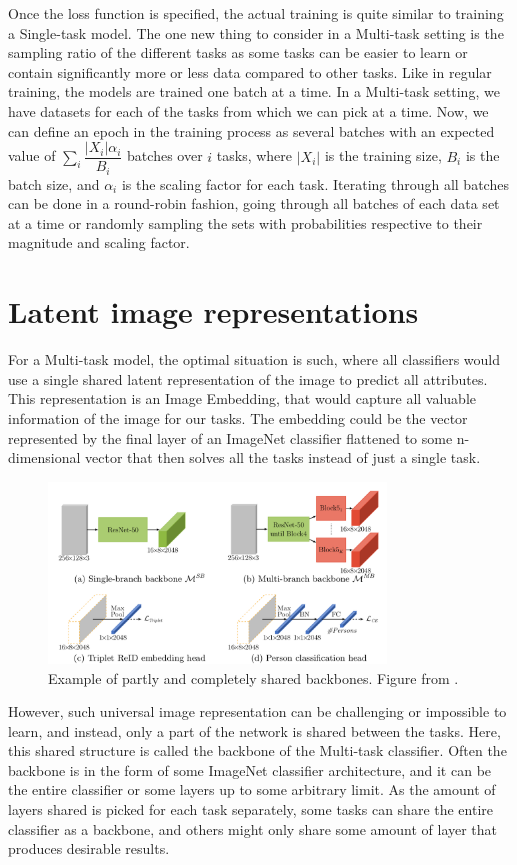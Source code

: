 Once the loss function is specified, the actual training is quite similar to training a Single-task model.
The one new thing to consider in a Multi-task setting is the sampling ratio of the different tasks as some tasks can be easier to learn or contain significantly more or less data compared to other tasks.
Like in regular training, the models are trained one batch at a time.
In a Multi-task setting, we have datasets for each of the tasks from which we can pick at a time.
Now, we can define an epoch in the training process as several batches with an expected value of $\sum_i{ \dfrac{|X_i| \alpha_i}{B_i}}$ batches over $i$ tasks, where $|X_i|$ is the training size, $B_i$ is the batch size, and $\alpha_i$ is the scaling factor for each task.
Iterating through all batches can be done in a round-robin fashion,  going through all batches of each data set at a time or randomly sampling the sets with probabilities respective to their magnitude and scaling factor.

\section{Latent image representations}
For a Multi-task model, the optimal situation is such, where all classifiers would use a single shared latent representation of the image to predict all attributes.
This representation is an Image Embedding, that would capture all valuable information of the image for our tasks.
The embedding could be the vector represented by the final layer of an ImageNet classifier flattened to some n-dimensional vector that then solves all the tasks instead of just a single task.
\begin{figure}[h!]
    \centering
    \includegraphics[width=0.8\textwidth]{imgs/sharedBackbone.png}
    \caption{Example of partly and completely shared backbones. Figure from \citep{visualPerson}.\label{fig:params}}
\end{figure}
However, such universal image representation can be challenging or impossible to learn, and instead, only a part of the network is shared between the tasks.
Here, this shared structure is called the backbone of the Multi-task classifier.
Often the backbone is in the form of some ImageNet classifier architecture, and it can be the entire classifier or some layers up to some arbitrary limit.
As the amount of layers shared is picked for each task separately, some tasks can share the entire classifier as a backbone, and others might only share some amount of layer that produces desirable results.


